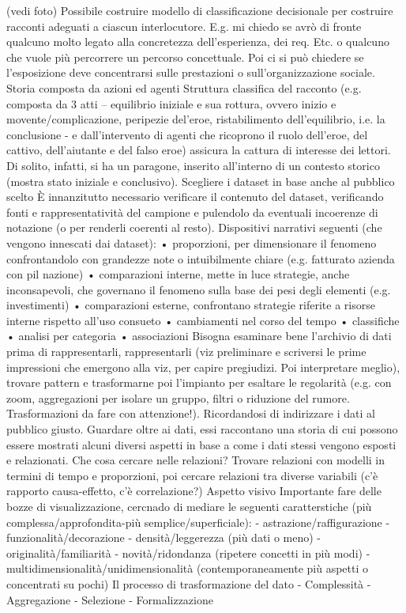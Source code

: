 (vedi foto)
Possibile costruire modello di classificazione decisionale per costruire racconti adeguati a ciascun interlocutore. E.g. mi chiedo se avrò di fronte qualcuno molto legato alla concretezza dell'esperienza, dei req. Etc. o qualcuno che vuole più percorrere un percorso concettuale. Poi ci si può chiedere se l'esposizione deve concentrarsi sulle prestazioni o sull'organizzazione sociale.
Storia composta da azioni ed agenti
Struttura classifica del racconto (e.g. composta da 3 atti – equilibrio iniziale e sua rottura, ovvero inizio e movente/complicazione, peripezie del'eroe, ristabilimento dell'equilibrio, i.e. la conclusione - e dall'intervento di agenti che ricoprono il ruolo dell'eroe, del cattivo, dell'aiutante e del falso eroe) assicura la cattura di interesse dei lettori.
Di solito, infatti, si ha un paragone, inserito all'interno di un contesto storico (mostra stato iniziale e conclusivo).
Scegliere i dataset in base anche al pubblico scelto 
È innanzitutto necessario verificare il contenuto del dataset, verificando fonti e rappresentatività del campione e pulendolo da eventuali incoerenze di notazione (o per renderli coerenti al resto).
Dispositivi narrativi seguenti (che vengono innescati dai dataset):
•	proporzioni, per dimensionare il fenomeno confrontandolo con grandezze note o intuibilmente chiare (e.g. fatturato azienda con pil nazione)
•	comparazioni interne, mette in luce strategie, anche inconsapevoli, che governano il fenomeno sulla base dei pesi degli elementi (e.g. investimenti)
•	comparazioni esterne, confrontano strategie riferite a risorse interne rispetto all'uso consueto
•	cambiamenti nel corso del tempo
•	classifiche
•	analisi per categoria
•	associazioni 
Bisogna esaminare bene l'archivio di dati prima di rappresentarli, rappresentarli (viz preliminare e scriversi le prime impressioni che emergono alla viz, per capire pregiudizi. Poi interpretare meglio), trovare pattern e trasformarne poi l'impianto per esaltare le regolarità (e.g. con zoom, aggregazioni per isolare un gruppo, filtri o riduzione del rumore. Trasformazioni da fare con attenzione!).
Ricordandosi di indirizzare i dati al pubblico giusto.
Guardare oltre ai dati, essi raccontano una storia di cui possono essere mostrati alcuni diversi aspetti in base a come i dati stessi vengono esposti e relazionati.
Che cosa cercare nelle relazioni?
Trovare relazioni con modelli in termini di tempo e proporzioni, poi cercare relazioni tra diverse variabili (c'è rapporto causa-effetto, c'è correlazione?) 
Aspetto visivo
Importante fare delle bozze di visualizzazione, cercnado di mediare le seguenti caratterstiche (più complessa/approfondita-più semplice/superficiale):
-	astrazione/raffigurazione
-	funzionalità/decorazione
-	densità/leggerezza (più dati o meno)
-	originalità/familiarità
-	novità/ridondanza (ripetere concetti in più modi)
-	multidimensionalità/unidimensionalità (contemporaneamente più aspetti o concentrati su pochi)
Il processo di trasformazione del dato
-	Complessità
-	Aggregazione
-	Selezione 
-	Formalizzazione 

